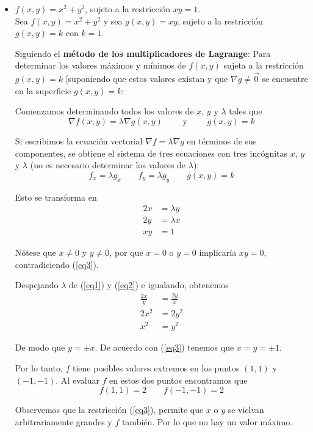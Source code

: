 \documentclass[12pt]{article}
\begin{document}
\begin{itemize}[format=\textbf]

\item $f(x, y) = x^2 + y^2$, sujeto a la restricción $xy = 1$. \\

  Sea $f(x,y)=x^2+y^2$ y sea $g(x,y)=xy$, sujeto a la restricción $g(x,y)=k$ con $k=1$.
  
  Siguiendo el \textbf{método de los multiplicadores de Lagrange}: Para determinar los valores máximos y mínimos de $f (x, y)$ sujeta a la restricción $g(x,y)=k$ [suponiendo que estos valores existan y que $\nabla g \neq \vec{0}$ se encuentre en la superficie $g(x,y)=k$:

    Comenzamos determinando todos los valores de $x$, $y$ y $\lambda$ tales que
    $$ \nabla f(x,y) = \lambda \nabla g(x,y) \qquad \text{ y } \qquad g(x,y)=k$$

    Si escribimos la ecuación vectorial $\nabla f = \lambda \nabla g$ en términos de sus componentes, se obtiene el sistema de tres ecuaciones con tres incógnitas $x$, $y$ y $\lambda$ (no es necesario determinar los valores de $\lambda$):
    $$f_x= \lambda g_x \qquad f_y=\lambda g_y \qquad g(x,y)=k$$

    Esto se transforma en
    \begin{align}
      2x &= \lambda y \label{eq1} \\
      2y &= \lambda x \label{eq2} \\
      xy &= 1 \label{eq3}
    \end{align}

    Nótese que $x \neq 0$ y $y \neq 0$, por que $x=0$ o $y=0$ implicaría $xy=0$, contradiciendo (\ref{eq3}).

    Despejando $\lambda$ de (\ref{eq1}) y (\ref{eq2}) e igualando, obtenemos
    \begin{align*}
      \frac{2x}{y} &= \frac{2y}{x} \\
      2x^2 &= 2y^2 \\
      x^2 &= y^2
    \end{align*}

    De modo que $y=\pm x$. De acuerdo con (\ref{eq3}) tenemos que $x=y=\pm 1$.

    Por lo tanto, $f$ tiene posibles valores extremos en los puntos $(1,1)$ y $(-1,-1)$. Al evaluar $f$ en estos dos puntos encontramos que
    $$f(1,1) = 2 \qquad f(-1,-1)=2$$

    Observemos que la restricción (\ref{eq3}), permite que $x$ o $y$ se vielvan arbitrariamente grandes y $f$ también. Por lo que no hay un valor máximo.
    

\end{itemize}
\end{document}
